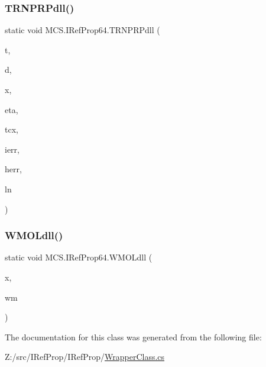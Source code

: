 \subsubsection{\texorpdfstring{T\+R\+N\+P\+R\+Pdll()}{TRNPRPdll()}}
{\footnotesize\ttfamily static void M\+C\+S.\+I\+Ref\+Prop64.\+T\+R\+N\+P\+R\+Pdll (\begin{DoxyParamCaption}\item[{ref double}]{t,  }\item[{ref double}]{d,  }\item[{\mbox{[}\+Marshal\+As(\+Unmanaged\+Type.\+L\+P\+Array, Size\+Param\+Index=0)\mbox{]} double \mbox{[}$\,$\mbox{]}}]{x,  }\item[{ref double}]{eta,  }\item[{ref double}]{tcx,  }\item[{ref long}]{ierr,  }\item[{\mbox{[}\+Marshal\+As(\+Unmanaged\+Type.\+V\+B\+By\+Ref\+Str)\mbox{]} ref string}]{herr,  }\item[{ref long}]{ln }\end{DoxyParamCaption})}

\hypertarget{class_m_c_s_1_1_i_ref_prop64_a7d1ce17eb19e761258b50e89d61d332c}{}\label{class_m_c_s_1_1_i_ref_prop64_a7d1ce17eb19e761258b50e89d61d332c} 
\subsubsection{\texorpdfstring{W\+M\+O\+Ldll()}{WMOLdll()}}
{\footnotesize\ttfamily static void M\+C\+S.\+I\+Ref\+Prop64.\+W\+M\+O\+Ldll (\begin{DoxyParamCaption}\item[{\mbox{[}\+Marshal\+As(\+Unmanaged\+Type.\+L\+P\+Array, Size\+Param\+Index=0)\mbox{]} double \mbox{[}$\,$\mbox{]}}]{x,  }\item[{ref double}]{wm }\end{DoxyParamCaption})}



The documentation for this class was generated from the following file\+:\begin{DoxyCompactItemize}
\item 
Z\+:/src/\+I\+Ref\+Prop/\+I\+Ref\+Prop/\hyperlink{_wrapper_class_8cs}{Wrapper\+Class.\+cs}\end{DoxyCompactItemize}
